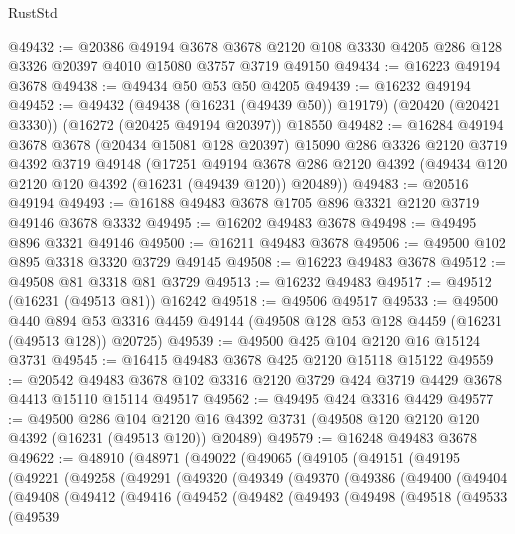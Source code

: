 \begin{lexlean}{RustStd}
\begin{coremodule}
@49432 := @20386
    @49194
    @3678
    @3678
    @2120
    @108
    @3330
    @4205
    @286
    @128
    @3326
    @20397
    @4010
    @15080
    @3757
    @3719
    @49150
@49434 := @16223 @49194 @3678
@49438 := @49434 @50 @53 @50 @4205
@49439 := @16232 @49194
@49452 := @49432
    (@49438 (@16231 (@49439 @50)) @19179)
    (@20420 (@20421 @3330))
    (@16272 (@20425 @49194 @20397))
    @18550
@49482 := @16284
    @49194
    @3678
    @3678
    (@20434 @15081 @128 @20397)
    @15090
    @286
    @3326
    @2120
    @3719
    @4392
    @3719
    @49148
    (@17251
      @49194
      @3678
      @286
      @2120
      @4392
      (@49434 @120 @2120 @120 @4392 (@16231 (@49439 @120)) @20489))
@49483 := @20516 @49194
@49493 := @16188 @49483 @3678 @1705 @896 @3321 @2120 @3719 @49146 @3678 @3332
@49495 := @16202 @49483 @3678
@49498 := @49495 @896 @3321 @49146
@49500 := @16211 @49483 @3678
@49506 := @49500 @102 @895 @3318 @3320 @3729 @49145
@49508 := @16223 @49483 @3678
@49512 := @49508 @81 @3318 @81 @3729
@49513 := @16232 @49483
@49517 := @49512 (@16231 (@49513 @81)) @16242
@49518 := @49506 @49517
@49533 := @49500
    @440
    @894
    @53
    @3316
    @4459
    @49144
    (@49508 @128 @53 @128 @4459 (@16231 (@49513 @128)) @20725)
@49539 := @49500 @425 @104 @2120 @16 @15124 @3731
@49545 := @16415 @49483 @3678 @425 @2120 @15118 @15122
@49559 := @20542
    @49483
    @3678
    @102
    @3316
    @2120
    @3729
    @424
    @3719
    @4429
    @3678
    @4413
    @15110
    @15114
    @49517
@49562 := @49495 @424 @3316 @4429
@49577 := @49500
    @286
    @104
    @2120
    @16
    @4392
    @3731
    (@49508 @120 @2120 @120 @4392 (@16231 (@49513 @120)) @20489)
@49579 := @16248 @49483 @3678
@49622 := @48910
    (@48971
      (@49022
        (@49065
          (@49105
            (@49151
              (@49195
                (@49221
                  (@49258
                    (@49291
                      (@49320
                        (@49349
                          (@49370
                            (@49386
                              (@49400
                                (@49404
                                  (@49408
                                    (@49412
                                      (@49416
                                        (@49452
                                          (@49482
                                            (@49493
                                              (@49498
                                                (@49518
                                                  (@49533
                                                    (@49539

\end{coremodule}
\end{lexlean}
